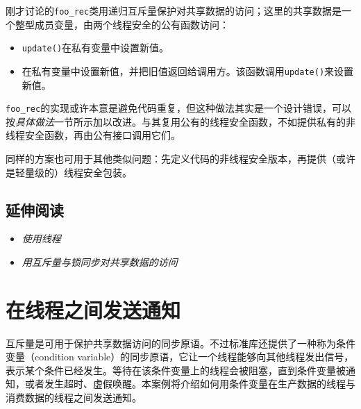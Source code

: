 刚才讨论的\texttt{foo\_\allowbreak{}rec}类用递归互斥量保护对共享数据的访问；这里的共享数据是一个整型成员变量，由两个线程安全的公有函数访问：



\begin{itemize}
\item \texttt{update()}在私有变量中设置新值。



\item {}在私有变量中设置新值，并把旧值返回给调用方。该函数调用\texttt{update()}来设置新值。

\end{itemize}



\texttt{foo\_\allowbreak{}rec}的实现或许本意是避免代码重复，但这种做法其实是一个设计错误，可以按\textit{具体做法}一节所示加以改进。与其复用公有的线程安全函数，不如提供私有的非线程安全函数，再由公有接口调用它们。



同样的方案也可用于其他类似问题：先定义代码的非线程安全版本，再提供（或许是轻量级的）线程安全包装。



\subsection{延伸阅读}



\begin{itemize}
\item \textit{使用线程}



\item \textit{用互斥量与锁同步对共享数据的访问}

\end{itemize}



\section{在线程之间发送通知}



互斥量是可用于保护共享数据访问的同步原语。不过标准库还提供了一种称为条件变量（condition variable）的同步原语，它让一个线程能够向其他线程发出信号，表示某个条件已经发生。等待在该条件变量上的线程会被阻塞，直到条件变量被通知，或者发生超时、虚假唤醒。本案例将介绍如何用条件变量在生产数据的线程与消费数据的线程之间发送通知。


